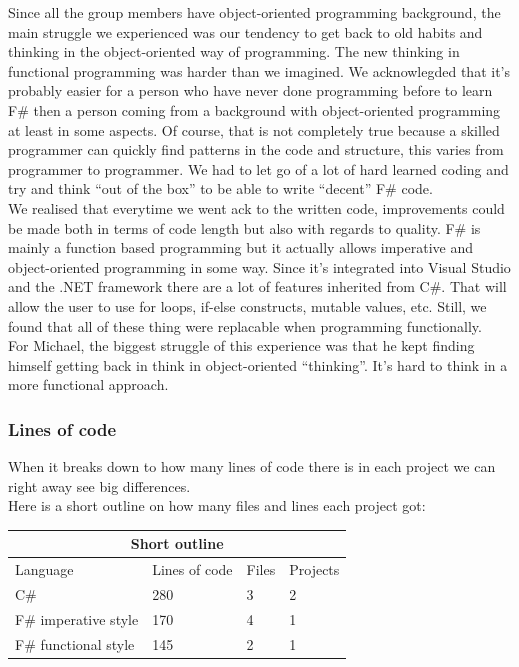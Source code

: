 \documentclass[12pt, a4paper]{article}
\begin{document}
Since all the group members have object-oriented programming background, the main struggle we experienced was our tendency to get back to old habits and thinking in the object-oriented way of programming. The new thinking in functional programming was harder than we imagined. We acknowlegded that it’s probably easier for a person who have never done programming before to learn F\# then a person coming from a background with object-oriented programming at least in some aspects. Of course, that is not completely true because a skilled programmer can quickly find patterns in the code and structure, this varies from programmer to programmer. We had to let go of a lot of hard learned coding and try and think “out of the box” to be able to write “decent” F\# code.\\

We realised that everytime we went ack to the written code, improvements could be made both in terms of code length but also with regards to quality. F\# is mainly a function based programming but it actually allows imperative and object-oriented programming in some way. Since it’s integrated into Visual Studio and the .NET framework there are a lot of features inherited from C\#. That will allow the user to use for loops, if-else constructs, mutable values, etc. Still, we found that all of these thing were replacable when programming functionally.\\

For Michael, the biggest struggle of this experience was that he kept finding himself getting back in think in object-oriented “thinking”. It's hard to think in a more functional approach.\\
\subsubsection{Lines of code}
\label{linesOfCode}
When it breaks down to how many lines of code there is in each project we can right away see big differences.\\

Here is a short outline on how many files and lines each project got:\\

\begin{tabular}{ |p{4cm}|p{3cm}|p{2cm}|p{3cm}|  }
 \hline
 \multicolumn{4}{|c|}{Short outline} \\
 \hline
 Language & Lines of code & Files & Projects\\
 \hline
 C\# & 280 & 3 & 2\\
 F\# imperative style & 170 & 4 & 1\\
 F\# functional style & 145 & 2 & 1\\
 \hline
\end{tabular}
\end{document}
